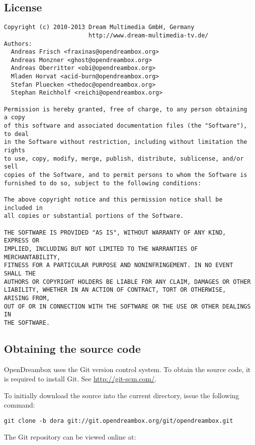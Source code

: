 \documentclass[a4paper]{article}
\newcommand{\shell}[1]{\texttt{\small #1}}
\begin{document}
  \subsection{License}

    \begin{verbatim}
Copyright (c) 2010-2013 Dream Multimedia GmbH, Germany
                        http://www.dream-multimedia-tv.de/
Authors:
  Andreas Frisch <fraxinas@opendreambox.org>
  Andreas Monzner <ghost@opendreambox.org>
  Andreas Oberritter <obi@opendreambox.org>
  Mladen Horvat <acid-burn@opendreambox.org>
  Stefan Pluecken <thedoc@opendreambox.org>
  Stephan Reichholf <reichi@opendreambox.org>

Permission is hereby granted, free of charge, to any person obtaining a copy
of this software and associated documentation files (the "Software"), to deal
in the Software without restriction, including without limitation the rights
to use, copy, modify, merge, publish, distribute, sublicense, and/or sell
copies of the Software, and to permit persons to whom the Software is
furnished to do so, subject to the following conditions:

The above copyright notice and this permission notice shall be included in
all copies or substantial portions of the Software.

THE SOFTWARE IS PROVIDED "AS IS", WITHOUT WARRANTY OF ANY KIND, EXPRESS OR
IMPLIED, INCLUDING BUT NOT LIMITED TO THE WARRANTIES OF MERCHANTABILITY,
FITNESS FOR A PARTICULAR PURPOSE AND NONINFRINGEMENT. IN NO EVENT SHALL THE
AUTHORS OR COPYRIGHT HOLDERS BE LIABLE FOR ANY CLAIM, DAMAGES OR OTHER
LIABILITY, WHETHER IN AN ACTION OF CONTRACT, TORT OR OTHERWISE, ARISING FROM,
OUT OF OR IN CONNECTION WITH THE SOFTWARE OR THE USE OR OTHER DEALINGS IN
THE SOFTWARE.
    \end{verbatim}

  \subsection{Obtaining the source code}
    OpenDreambox uses the Git version control system. To obtain the source
    code, it is required to install Git. See \url{http://git-scm.com/}.

    To initially download the source into the current directory, issue the
    following command:

    \shell{git clone -b dora git://git.opendreambox.org/git/opendreambox.git}

    The Git repository can be viewed online at:
\end{document}
